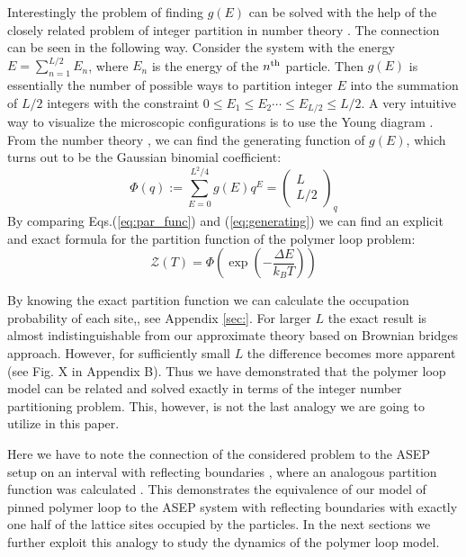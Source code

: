 \documentclass[aps,showpacs,twocolumn,floatfix,prx,superscriptaddress]{revtex4-1}
\begin{document}
Interestingly the problem of finding $g(E)$ can be solved with the help of the closely related problem of integer partition in number theory \cite{andrews1998theory}. 
The connection can be seen in the following way. Consider the system with the energy $E=\sum_{n=1}^{L/2}E_n$, where $E_n$ is the energy of the $n^{\rm{th}}$ particle. Then $g(E)$ is essentially the number of possible ways to partition integer $E$ into the summation of $L/2$ integers with the constraint $0\le E_1\le E_2\cdots\le E_{L/2}\le L/2$.
A very intuitive way to visualize the microscopic configurations is to use the Young diagram \cite{andrews1998theory}. From the number theory \cite{andrews1998theory}, we can find the generating function of $g(E)$, which turns out to be the Gaussian binomial coefficient:
\begin{equation}
    \Phi (q) := \sum_{E=0}^{L^2/4} g(E) q^E = \left(\begin{array}{c} L \\ L/2 \end{array}\right)_q
\label{eq:generating}
\end{equation}
By comparing Eqs.(\ref{eq:par_func}) and (\ref{eq:generating}) we can find an explicit and exact formula for the partition function of the polymer loop problem:
\begin{equation}
\label{eq:par_func_exact}
    \mathcal{Z}\left(T\right) = \Phi \left(\exp\left(-\frac{\Delta E}{k_B T}\right)\right) 
\end{equation}


By knowing the exact partition function we can calculate the occupation probability of each site,, see Appendix \ref{sec:}. For larger $L$ the exact result is almost indistinguishable from our approximate theory based on Brownian bridges approach. However, for sufficiently small $L$ the difference becomes more apparent (see Fig. X in Appendix B). Thus we have demonstrated that the polymer loop model can be related and solved exactly in terms of the integer number partitioning problem. This, however, is not the last analogy we are going to utilize in this paper.

Here we have to note the connection of the considered problem to the ASEP setup on an interval with reflecting boundaries \cite{}, where an analogous partition function was calculated \cite{}. This demonstrates the equivalence of our model of pinned polymer loop to the ASEP system with reflecting boundaries with exactly one half of the lattice sites occupied by the particles. In the next sections we further exploit this analogy to study the dynamics of the polymer loop model.
\end{document}
